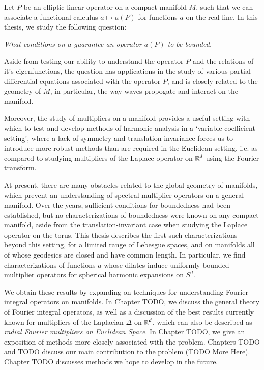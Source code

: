 
Let $P$ be an elliptic linear operator on a compact manifold $M$, such that we can associate a functional calculus $a \mapsto a(P)$ for functions $a$ on the real line. In this thesis, we study the following question:  
%
\begin{changemargin}{2cm}{2cm}
\begin{center}
  \emph{What conditions on $a$ guarantee an operator $a(P)$ to be bounded.}
\end{center}
\end{changemargin}
%
Aside from testing our ability to understand the operator $P$ and the relations of it's eigenfunctions, the question has applications in the study of various partial differential equations associated with the operator $P$, and is closely related to the geometry of $M$, in particular, the way waves propogate and interact on the manifold.

Moreover, the study of multipliers on a manifold provides a useful setting with which to test and develop methods of harmonic analysis in a `variable-coefficient setting', where a lack of symmetry and translation invariance forces us to introduce more robust methods than are required in the Euclidean setting, i.e. as compared to studying multipliers of the Laplace operator on $\operatorname{\mathbb{R}}^d$ using the Fourier transform.

At present, there are many obstacles related to the global geometry of manifolds, which prevent an understanding of spectral multiplier operators on a general manifold. Over the years, sufficient conditions for boundedness had been established, but no characterizations of boundedness were known on any compact manifold, aside from the translation-invariant case when studying the Laplace operator on the torus. This thesis describes the first such characterizations beyond this setting, for a limited range of Lebesgue spaces, and on manifolds all of whose geodesics are closed and have common length. In particular, we find characterizations of functions $a$ whose dilates induce uniformly bounded multiplier operators for spherical harmonic expansions on $S^d$.

We obtain these results by expanding on techniques for understanding Fourier integral operators on manifolds. In Chapter TODO, we discuss the general theory of Fourier integral operators, as well as a discussion of the best results currently known for multipliers of the Laplacian $\Delta$ on $\operatorname{\mathbb{R}}^d$, which can also be described as \emph{radial Fourier multipliers on Euclidean Space}. In Chapter TODO, we give an exposition of methods more closely associated with the problem. Chapters TODO and TODO discuss our main contribution to the problem (TODO More Here). Chapter TODO discusses methods we hope to develop in the future.